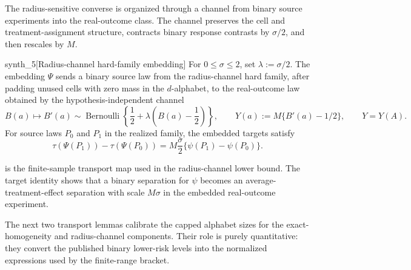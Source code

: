 \documentclass[11pt]{article}
\begin{document}
The radius-sensitive converse is organized through a channel from binary source experiments into the real-outcome class. The channel preserves the cell and treatment-assignment structure, contracts binary response contrasts by \(\sigma/2\), and then rescales by \(M\).

\begin{definitionv}{synth_5}[Radius-channel hard-family embedding]
For \(0\le\sigma\le2\), set \(\lambda:=\sigma/2\). The embedding \(\Psi\) sends a binary source law from the radius-channel hard family, after padding unused cells with zero mass in the \(d\)-alphabet, to the real-outcome law obtained by the hypothesis-independent channel
\[
B(a)\longmapsto B'(a)\sim\operatorname{Bernoulli}\!\left\{\frac12+\lambda\left(B(a)-\frac12\right)\right\},
\qquad
Y(a):=M\{B'(a)-1/2\},
\qquad
Y=Y(A).
\]
For source laws \(P_0\) and \(P_1\) in the realized family, the embedded targets satisfy
\[
\tau(\Psi(P_1))-\tau(\Psi(P_0))
=
M\frac{\sigma}{2}\{\psi(P_1)-\psi(P_0)\}.
\]
\end{definitionv}

 is the finite-sample transport map used in the radius-channel lower bound. The target identity shows that a binary separation for \(\psi\) becomes an average-treatment-effect separation with scale \(M\sigma\) in the embedded real-outcome experiment.

The next two transport lemmas calibrate the capped alphabet sizes for the exact-homogeneity and radius-channel components. Their role is purely quantitative: they convert the published binary lower-risk levels into the normalized expressions used by the finite-range bracket.
\end{document}
